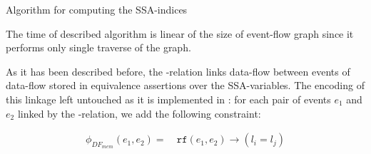 \begin{algorithm}
    \caption{Algorithm for computing the SSA-indices}\label{alg:compute-ssa}
    \begin{algorithmic}[1]
                         
                        \EndIf
                    \EndFor
                \EndFor
            \EndFor
        \EndFunction
    \end{algorithmic}
    \label{algorithm:ssa-map}
\end{algorithm}

The time of described algorithm is linear of the size of event-flow graph since it performs only single traverse of the graph.

As it has been described before, the \rf-relation links data-flow between events %
of data-flow stored in equivalence assertions over the SSA-variables. 
The encoding of this linkage left untouched as it is implemented in \porthos: for each pair of events $e_1$ and $e_2$ linked by the \rf-relation, we add the following constraint:

\begin{align}
\phi_{DF_{mem}}(e_1, e_2) = \ & \mathtt{rf}(e_1, e_2) \rightarrow (l_i = l_j) 
\end{align}

